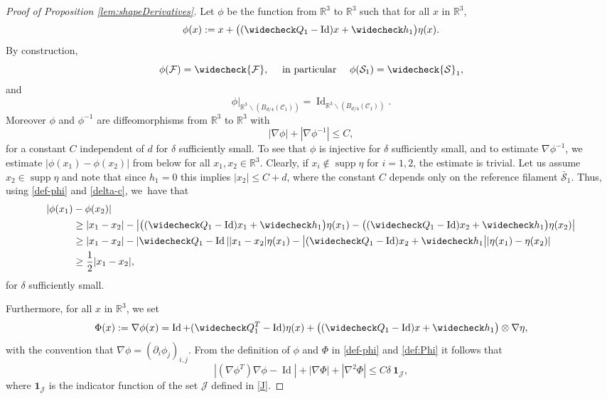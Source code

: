 \documentclass[10pt]{amsart}
\newcommand{\R}{\mathbb{R}}
\DeclareMathOperator{\Id}{Id}
\DeclareMathOperator{\supp}{supp}
\theoremstyle{definition}
\theoremstyle{remark}
\begin{document}
\begin{proof}[Proof of Proposition \ref{lem:shapeDerivatives}]
Let $\phi$ be the function from $\R^3$ to $\R^3$ such that for all $x$ in $\R^3$,
\begin{equation} \label{def-phi}
\phi(x) := x + \bigl((\widecheck Q_1 - \Id)x + \widecheck h_1 \bigr) \eta(x).
\end{equation}
By construction,
\begin{equation} \label{dodomain}
\phi(\mathcal F) = \widecheck {\mathcal F}, \quad \text{ in particular } \quad
\phi(\mathcal S_1) = \widecheck {\mathcal S}_1,
\end{equation}
and
\begin{equation} \label{elaid}
\phi \vert_{\R^3 \smallsetminus (B_{d/4}(\mathcal C_1))} = \Id_{\R^3 \smallsetminus (B_{d/4}(\mathcal C_1))}.
\end{equation}
Moreover $\phi$ and $\phi^{-1}$ are diffeomorphisms from $\R^3$ to $\R^3$
with
\begin{equation}
\label{pourcp}
|\nabla \phi| + |\nabla \phi^{-1}| \leq C,
\end{equation}
for a constant $C$ independent of $d$ for $\delta$ sufficiently small.
To see that $\phi$ is injective for $\delta$ sufficiently small, and to estimate $\nabla \phi^{-1}$, we estimate $|\phi(x_1) - \phi(x_2)|$ from below for all $x_1,x_2 \in \R^3$. Clearly, if $x_i \not \in \supp \eta$ for $i = 1,2$, the estimate is trivial.
Let us assume $x_2 \in \supp \eta$ and note that since $h_1 = 0$ this implies $|x_2| \leq C + d$,
where the constant $C$ depends only on the reference filament $\bar{\mathcal S}_1$.
Thus, using \eqref{def-phi} and \eqref{delta-c}, we~have that
\begin{align*}
|\phi(x_1) &- \phi(x_2)| \\
&\geq |x_1 - x_2| - \big|\big((\widecheck Q_1 - \Id)x_1 + \widecheck h_1 \big) \eta(x_1) - \big((\widecheck Q_1 - \Id)x_2 + \widecheck h_1 \big) \eta(x_2)\big| \\
& \geq |x_1 - x_2| - |\widecheck Q_1 - \Id||x_1 - x_2| \eta(x_1) - \big|(\widecheck Q_1 - \Id)x_2 + \widecheck h_1 \big||\eta(x_1) - \eta(x_2)| \\
& \geq \frac 1 2 |x_1 - x_2|,
\end{align*}
for $\delta$ sufficiently small.

Furthermore, for all $x$ in $\R^3$, we set
\begin{equation} \label{def:Phi}
\Phi(x) := {\nabla\phi(x)} = \Id + (\widecheck Q_1^T - \Id) \eta(x) +
\bigl((\widecheck Q_1 - \Id)x + \widecheck h_1 \bigr) \otimes \nabla \eta,
\end{equation}
with the convention that $\nabla\phi = (\partial_i \phi_j)_{i,j}$.
From the definition of $\phi$ and $\Phi$ in \eqref{def-phi} and \eqref{def:Phi}
it follows that
\begin{equation} \label{esti-mir}
|(\nabla \phi^T) \nabla \phi - \Id|+
|\nabla \Phi|+ |\nabla^2 \Phi| \leq C \delta \ \mathbf{1}_{\mathcal J},
\end{equation}
where $ \mathbf{1}_\mathcal{J}$ is the indicator function of the set $\mathcal{J}$ defined in \eqref{J}.


\end{proof}
\end{document}
